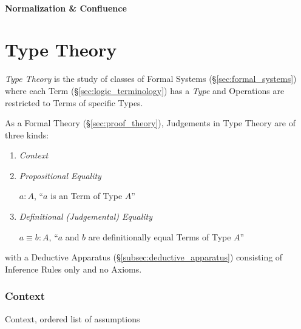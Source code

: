 \documentclass{article}
\begin{document}
\subsection{Normalization \& Confluence}\label{subsec:normalization_confluence}



\part{Type Theory}\label{sec:type_theory}

\emph{Type Theory} is the study of classes of Formal Systems
(\S\ref{sec:formal_systems}) where each Term
(\S\ref{sec:logic_terminology}) has a \emph{Type} and Operations
are restricted to Terms of specific Types.

As a Formal Theory (\S\ref{sec:proof_theory}), Judgements in Type
Theory are of three kinds\cite{hott13}:
\begin{enumerate}

\item \emph{Context}

\item \emph{Propositional Equality}

$a : A$, ``$a$ is an Term of Type $A$''

\item \emph{Definitional (Judgemental) Equality}

$a \equiv b : A$, ``$a$ and $b$ are definitionally equal Terms of Type
  $A$''

\end{enumerate}
with a Deductive Apparatus (\S\ref{subsec:deductive_apparatus})
consisting of Inference Rules only and no Axioms.

\section{Context}\label{subsec:type_context}

Context, ordered list of assumptions

\end{document}
